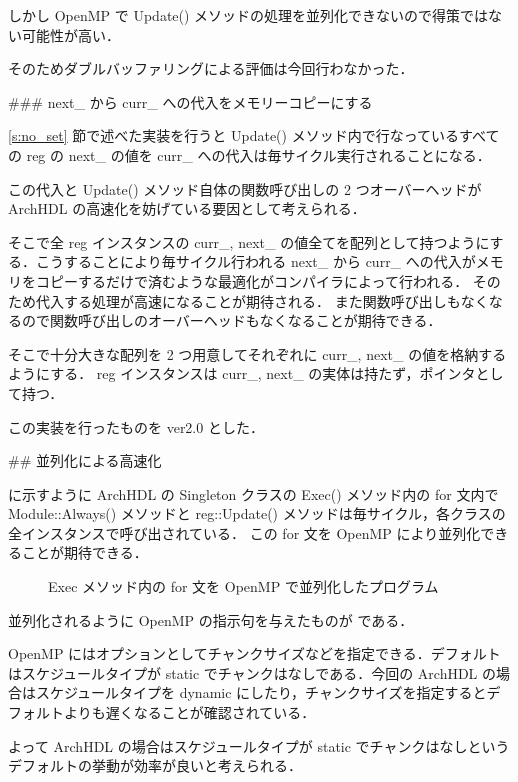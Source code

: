 しかし OpenMP で Update() メソッドの処理を並列化できないので得策ではない可能性が高い．

そのためダブルバッファリングによる評価は今回行わなかった．


### next_ から curr_ への代入をメモリーコピーにする

\ref{s:no_set} 節で述べた実装を行うと
Update() メソッド内で行なっているすべての reg の next_
の値を curr_ への代入は毎サイクル実行されることになる．

この代入と Update() メソッド自体の関数呼び出しの
2 つオーバーヘッドが ArchHDL の高速化を妨げている要因として考えられる．

そこで全 reg インスタンスの curr_, next_
の値全てを配列として持つようにする．こうすることにより毎サイクル行われる next_ から curr_
への代入がメモリをコピーするだけで済むような最適化がコンパイラによって行われる．
そのため代入する処理が高速になることが期待される．
また関数呼び出しもなくなるので関数呼び出しのオーバーヘッドもなくなることが期待できる．

そこで十分大きな配列を 2 つ用意してそれぞれに curr_, next_ の値を格納するようにする．
reg インスタンスは curr_, next_ の実体は持たず，ポインタとして持つ．

この実装を行ったものを ver2.0 とした．




## 並列化による高速化 \label{ss:parallel}

 に示すように
ArchHDL の Singleton クラスの Exec() メソッド内の
for 文内で Module::Always() メソッドと
reg::Update() メソッドは毎サイクル，各クラスの全インスタンスで呼び出されている．
この for 文を OpenMP により並列化できることが期待できる．

\begin{figure}[t]
 
 \caption{Exec メソッド内の for 文を OpenMP で並列化したプログラム}
 \label{src:exec_openmp}
\end{figure}

並列化されるように OpenMP の指示句を与えたものが  である．

OpenMP にはオプションとしてチャンクサイズなどを指定できる．デフォルトはスケジュールタイプが
static でチャンクはなしである．今回の ArchHDL の場合はスケジュールタイプを dynamic
にしたり，チャンクサイズを指定するとデフォルトよりも遅くなることが確認されている．

よって ArchHDL の場合はスケジュールタイプが static でチャンクはなしというデフォルトの挙動が効率が良いと考えられる．

